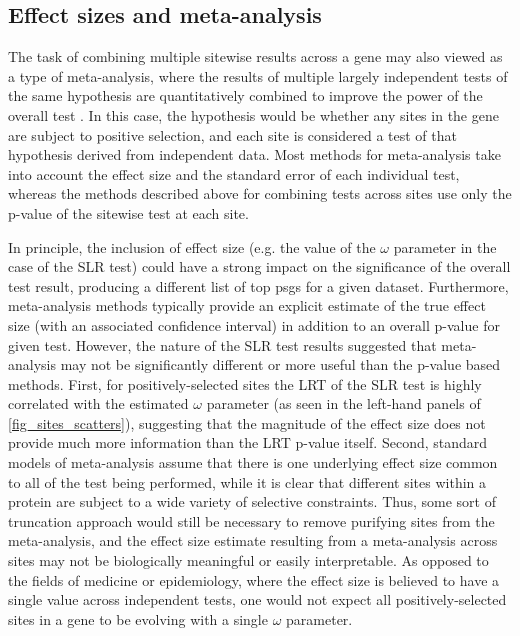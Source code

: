 \subsection{Effect sizes and meta-analysis}


The task of combining multiple sitewise results across a gene may also
viewed as a type of meta-analysis, where the results of multiple
largely independent tests of the same hypothesis are quantitatively
combined to improve the power of the overall test
\citep{Lipsey2001,Stewart2010}. In this case, the hypothesis would be
whether any sites in the gene are subject to positive selection, and
each site is considered a test of that hypothesis derived from
independent data. Most methods for meta-analysis take into account the
effect size and the standard error of each individual test, whereas
the methods described above for combining tests across sites use only
the p-value of the sitewise test at each site.

In principle, the inclusion of effect size (e.g. the value of the
$\omega$ parameter in the case of the SLR test) could have a strong
impact on the significance of the overall test result, producing a
different list of top \acp{psg} for a given dataset. Furthermore,
meta-analysis methods typically provide an explicit estimate of the
true effect size (with an associated confidence interval) in addition
to an overall p-value for given test. However, the nature of the SLR
test results suggested that meta-analysis may not be significantly
different or more useful than the p-value based methods. First, for
positively-selected sites the LRT of the SLR test is highly correlated
with the estimated $\omega$ parameter (as seen in the left-hand panels
of \ref{fig_sites_scatters}), suggesting that the magnitude of the
effect size does not provide much more information than the LRT
p-value itself. Second, standard models of meta-analysis assume that
there is one underlying effect size common to all of the test being
performed, while it is clear that different sites within a protein are
subject to a wide variety of selective constraints. Thus, some sort of
truncation approach would still be necessary to remove purifying sites
from the meta-analysis, and the effect size estimate resulting from a
meta-analysis across sites may not be biologically meaningful or
easily interpretable. As opposed to the fields of medicine or
epidemiology, where the effect size is believed to have a single value
across independent tests, one would not expect all positively-selected
sites in a gene to be evolving with a single $\omega$ parameter.

